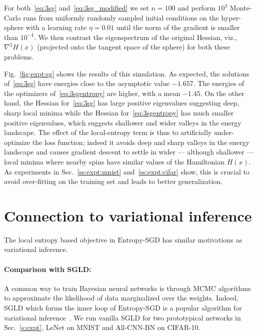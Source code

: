 \documentclass[10pt]{article}
\newcommand{\entropysgd}{\mathrm{Entropy}\textrm{-}\mathrm{SGD}}
\newcommand{\lenet}{\textrm{LeNet}}
\newcommand{\allcnn}{\textrm{All-CNN-BN}}
\begin{document}
\begin{appendices}
{For both~\eqref{eq:3sg} and~\eqref{eq:3sg_modified} we set $n = 100$ and perform $10^3$ Monte-Carlo runs from uniformly randomly sampled initial conditions on the hyper-sphere with a learning rate $\eta = 0.01$ until the norm of the gradient is smaller than $10^{-4}$. We then contrast the eigenspectrum of the original Hessian, viz., $\nabla^2 H(x)$ (projected onto the tangent space of the sphere) for both these problems.

Fig.~\ref{fig:expt:sg} shows the results of this simulation. As expected, the solutions of~\eqref{eq:3sg} have energies close to the asymptotic value $-1.657$. The energies of the optimizers of~\eqref{eq:3sgentropy} are higher, with a mean $-1.45$. On the other hand, the Hessian for~\eqref{eq:3sg} has large positive eigenvalues suggesting deep, sharp local minima while the Hessian for~\eqref{eq:3sgentropy} has much smaller positive eigenvalues, which suggests shallower and wider valleys in the energy landscape. The effect of the local-entropy term is thus to artificially under-optimize the loss function; indeed it avoids deep and sharp valleys in the energy landscape and causes gradient descent to settle in wider --- although shallower --- local minima where nearby spins have similar values of the Hamiltonian $H(x)$. As experiments in Sec.~\ref{ss:expt:mnist} and~\ref{ss:expt:cifar} show, this is crucial to avoid over-fitting on the training set and leads to better generalization.
}

\section{Connection to variational inference}
\label{s:app:connection_variational}
The local entropy based objective in $\entropysgd$ has similar motivations as variational inference.

\paragraph{Comparison with SGLD:}
A common way to train Bayesian neural networks is through MCMC algorithms to approximate the likelihood of data marginalized over the weights. Indeed, SGLD which forms the inner loop of $\entropysgd$ is a popular algorithm for variational inference~\citep{balan2015bayesian}. We run vanilla SGLD for two prototypical networks in Sec.~\ref{s:expt}, $\lenet$ on MNIST and $\allcnn$ on CIFAR-10.


\end{appendices}
\end{document}
